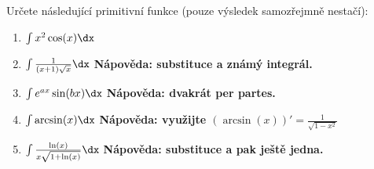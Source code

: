 Určete následující primitivní funkce (pouze výsledek samozřejmně nestačí):
\begin{enumerate}

	\item  $\int x^2 \cos(x) \dx$

	\item  $\int \frac{1}{(x+1)\sqrt{x}} \dx$
		\textbf{Nápověda: substituce a známý integrál.}

	\item  $\int e^{ax} \sin(bx) \dx$
		\textbf{Nápověda: dvakrát per partes.}

	\item  $\int \arcsin(x) \dx$
		\textbf{Nápověda: využijte $(\arcsin(x))' = \frac{1}{\sqrt{1-x^2}}$}

	\item  $\int \frac{\ln(x)}{x \sqrt{1 + \ln(x)}} \dx$
		\textbf{Nápověda: substituce a pak ještě jedna.}

\end{enumerate}

